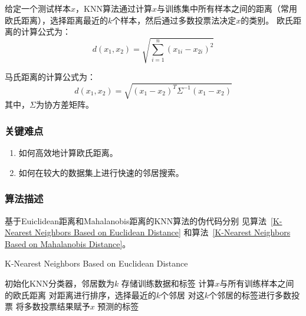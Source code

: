 \documentclass[12pt]{article}
\begin{document}
给定一个测试样本$x$，KNN算法通过计算$x$与训练集中所有样本之间的距离（常用欧氏距离），选择距离最近的$k$个样本，然后通过多数投票法决定$x$的类别。
欧氏距离的计算公式为：
\[
  d(x_1, x_2) = \sqrt{\sum_{i=1}^{n} (x_{1i} - x_{2i})^2}
\]

马氏距离的计算公式为：
\[d(x_1, x_2) = \sqrt{(x_1 - x_2)^T \Sigma^{-1} (x_1 - x_2)}\]
其中，$\Sigma$为协方差矩阵。


\subsubsection{关键难点}
\begin{enumerate}
  \item 如何高效地计算欧氏距离。
  \item 如何在较大的数据集上进行快速的邻居搜索。
\end{enumerate}


\subsubsection{算法描述}
基于Euiclidean距离和Mahalanobis距离的KNN算法的伪代码分别
见算法~\ref{K-Nearest Neighbors Based on Euclidean Distance} 和算法~\ref{K-Nearest Neighbors Based on Mahalanobis Distance}。

\begin{algorithm}
  \caption{K-Nearest Neighbors Based on Euclidean Distance}
  \label{K-Nearest Neighbors Based on Euclidean Distance}
  \begin{algorithmic}[1]
    \State 初始化KNN分类器，邻居数为$k$
    \State 存储训练数据和标签
    \EndProcedure
    \State 计算$x$与所有训练样本之间的欧氏距离
    \State 对距离进行排序，选择最近的$k$个邻居
    \State 对这$k$个邻居的标签进行多数投票
    \State 将多数投票结果赋予$x$
    \EndFor
    \State \Return 预测的标签
    \EndProcedure
  \end{algorithmic}
\end{algorithm}
\end{document}

